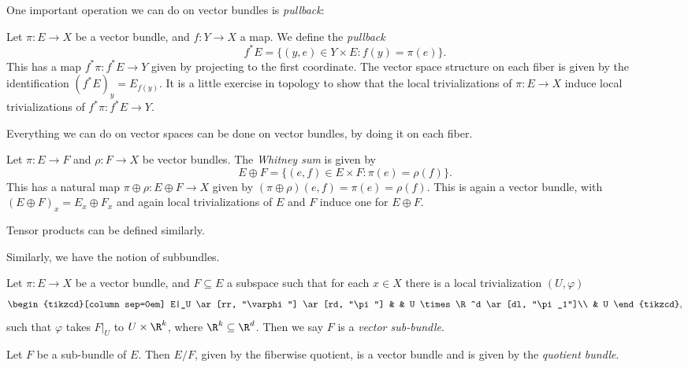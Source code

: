 \documentclass[a4paper]{article}
\begin{document}
One important operation we can do on vector bundles is \emph{pullback}:
\begin{defi}
  Let $\pi: E \to X$ be a vector bundle, and $f: Y \to X$ a map. We define the \emph{pullback}
  \[
    f^* E = \{(y, e) \in Y \times E: f(y) = \pi(e)\}.
  \]
  This has a map $f^*\pi: f^*E \to Y$ given by projecting to the first coordinate. The vector space structure on each fiber is given by the identification $(f^*E)_y = E_{f(y)}$. It is a little exercise in topology to show that the local trivializations of $\pi: E \to X$ induce local trivializations of $f^*\pi: f^* E \to Y$.
\end{defi}

Everything we can do on vector spaces can be done on vector bundles, by doing it on each fiber.
\begin{defi}
  Let $\pi: E \to F$ and $\rho: F \to X$ be vector bundles. The \emph{Whitney sum} is given by
  \[
    E \oplus F = \{(e, f)\in E \times F: \pi(e) = \rho(f)\}.
  \]
  This has a natural map $\pi \oplus \rho: E \oplus F \to X$ given by $(\pi \oplus \rho)(e, f) = \pi(e) = \rho(f)$. This is again a vector bundle, with $(E \oplus F)_x = E_x \oplus F_x$ and again local trivializations of $E$ and $F$ induce one for $E \oplus F$.
\end{defi}
Tensor products can be defined similarly.

Similarly, we have the notion of subbundles.
\begin{defi}
  Let $\pi: E \to X$ be a vector bundle, and $F \subseteq E$ a subspace such that for each $x \in X$ there is a local trivialization $(U, \varphi)$
  \[
    \begin{tikzcd}[column sep=0em]
      E|_U \ar[rr, "\varphi"] \ar[rd, "\pi"] & & U \times \R^d \ar[dl, "\pi_1"]\\
      & U
    \end{tikzcd},
  \]
  such that $\varphi$ takes $F|_U$ to $U \times \R^k$, where $\R^k \subseteq \R^d$. Then we say $F$ is a \emph{vector sub-bundle}.
\end{defi}

\begin{defi}
  Let $F$ be a sub-bundle of $E$. Then $E/F$, given by the fiberwise quotient, is a vector bundle and is given by the \emph{quotient bundle}.
\end{defi}
\end{document}
